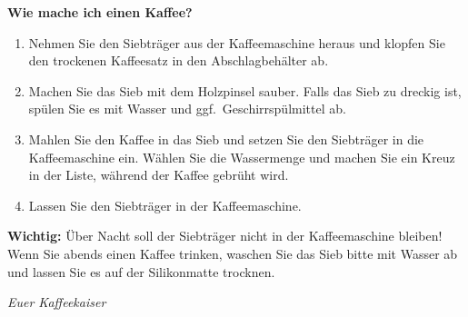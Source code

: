 \documentclass[a4paper, 12pt, ngerman]{article}
\begin{document}
\selectfont

\vspace*{10 mm}

\begin{center}
  \LARGE \textbf{Wie mache ich einen Kaffee?}
\end{center}

\vspace*{5 mm}

\large

\begin{enumerate}
  \item Nehmen Sie den Siebträger aus der Kaffeemaschine heraus und
  klopfen Sie den trockenen Kaffeesatz in den Abschlagbehälter ab.

  \item Machen Sie das Sieb mit dem Holzpinsel sauber.
  Falls das Sieb zu dreckig ist, spülen Sie es mit Wasser und ggf.\ Geschirrspülmittel ab.

  \item Mahlen Sie den Kaffee in das Sieb und setzen Sie den Siebträger in die Kaffeemaschine ein.
  Wählen Sie die Wassermenge und machen Sie ein Kreuz in der Liste, während der Kaffee gebrüht wird.

  \item Lassen Sie den Siebträger in der Kaffeemaschine.
\end{enumerate}

\vspace*{5 mm}

\textbf{Wichtig:} Über Nacht soll der Siebträger nicht in der Kaffeemaschine bleiben!
Wenn Sie abends einen Kaffee trinken, waschen Sie das Sieb bitte mit Wasser ab und
lassen Sie es auf der Silikonmatte trocknen.

\vspace*{10 mm}

\begin{flushright}\normalsize\textrm{\textit{Euer Kaffeekaiser\\\kaiserName}}\end{flushright}
\end{document}
